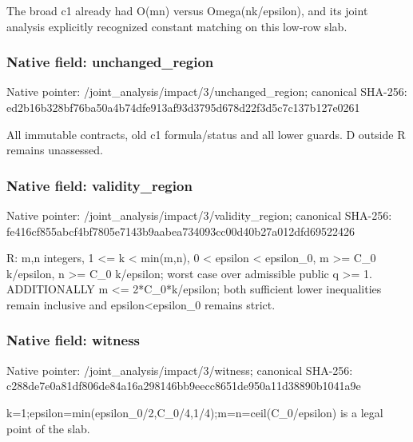 \documentclass[10pt,a4paper]{article}
\begin{document}
\begingroup\raggedright\sloppy The broad c1 already had O(mn) versus Omega(nk/\allowbreak{}epsilon),\allowbreak{} and its joint analysis explicitly recognized constant matching on this low-row slab.\par\endgroup

\subsubsection{Native field: unchanged\_\allowbreak{}region}
Native pointer: /joint\_\allowbreak{}analysis/impact/3/unchanged\_\allowbreak{}region; canonical SHA-256: ed2b16b328bf76ba50a4b74dfe913af93d3795d678d22f3d5c7c137b127e0261

\begingroup\raggedright\sloppy All immutable contracts,\allowbreak{} old c1 formula/\allowbreak{}status and all lower guards. D outside R remains unassessed.\par\endgroup

\subsubsection{Native field: validity\_\allowbreak{}region}
Native pointer: /joint\_\allowbreak{}analysis/impact/3/validity\_\allowbreak{}region; canonical SHA-256: fe416cf855abcf4bf7805e7143b9aabea734093cc00d40b27a012dfd69522426

\begingroup\raggedright\sloppy R:\allowbreak{} m,\allowbreak{}n integers,\allowbreak{} 1 <=\allowbreak{} k < min(m,\allowbreak{}n),\allowbreak{} 0 < epsilon < epsilon\_\allowbreak{}0,\allowbreak{} m >=\allowbreak{} C\_\allowbreak{}0 k/\allowbreak{}epsilon,\allowbreak{} n >=\allowbreak{} C\_\allowbreak{}0 k/\allowbreak{}epsilon;\allowbreak{} worst case over admissible public q >=\allowbreak{} 1. ADDITIONALLY m <=\allowbreak{} 2*C\_\allowbreak{}0*k/\allowbreak{}epsilon;\allowbreak{} both sufficient lower inequalities remain inclusive and epsilon<epsilon\_\allowbreak{}0 remains strict.\par\endgroup

\subsubsection{Native field: witness}
Native pointer: /joint\_\allowbreak{}analysis/impact/3/witness; canonical SHA-256: c288de7e0a81df806de84a16a298146bb9eecc8651de950a11d38890b1041a9e

\begingroup\raggedright\sloppy k=\allowbreak{}1;\allowbreak{}epsilon=\allowbreak{}min(epsilon\_\allowbreak{}0/\allowbreak{}2,\allowbreak{}C\_\allowbreak{}0/\allowbreak{}4,\allowbreak{}1/\allowbreak{}4);\allowbreak{}m=\allowbreak{}n=\allowbreak{}ceil(C\_\allowbreak{}0/\allowbreak{}epsilon) is a legal point of the slab.\par\endgroup
\end{document}
